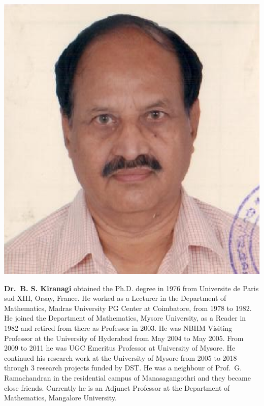 \centerline{\includegraphics[scale=.5]{authorsphotos/Prof_B_S_Kiranagi.eps}}
\smallskip 

\bigskip

\noindent
\textbf{Dr.\ B. S. Kiranagi} obtained the Ph.D. degree in 1976 from Universite de Paris sud XIII, Orsay, France. He worked as a Lecturer in the Department of Mathematics, Madras University PG Center at Coimbatore, from 1978 to 1982. He joined the Department of Mathematics, Mysore University, as a Reader in 1982 and retired from there as Professor in 2003. He was NBHM Visiting Professor at the University of Hyderabad from May 2004 to May 2005. From 2009 to 2011 he was UGC Emeritus Professor at University of Mysore. He continued his research work at the University of Mysore from 2005 to 2018 through 3 research projects funded by DST. He was a neighbour of Prof.\ G. Ramachandran in the residential campus of Manasagangothri and they became close friends. Currently he is an Adjunct Professor at the Department of Mathematics, Mangalore University.
